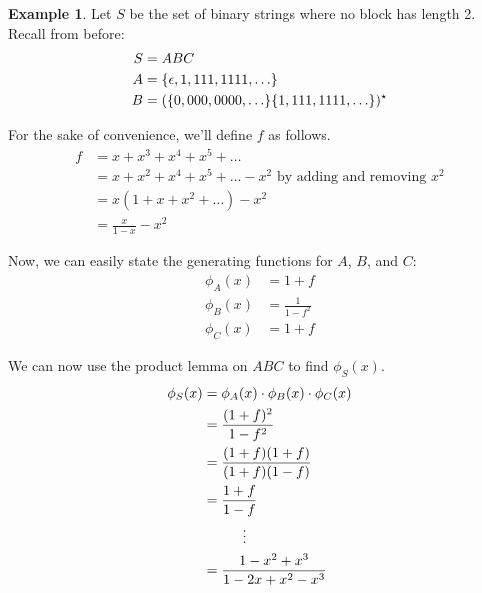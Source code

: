 \documentclass[]{article}
\theoremstyle{definition}
\newtheorem{ex}{Example}[section]
\DeclarePairedDelimiter{\set}{\lbrace}{\rbrace}
\begin{document}
			\begin{ex}
				Let $S$ be the set of binary strings where no block has length 2. Recall from before:
				\begin{align*}
					S &= ABC \\
					A &= \set{\epsilon, 1, 111, 1111, \ldots} \\
					B &= (\set{0, 000, 0000, \ldots}\set{1, 111, 1111, \ldots})^\star
				\end{align*}

				For the sake of convenience, we'll define $f$ as follows.
				\begin{align*}
					f &= x + x^3 + x^4 + x^5 + \ldots \\
					&= x + x^2 + x^4 + x^5 + \ldots - x^2 \text{ by adding and removing } x^2 \\
					&= x(1 + x + x^2 + \ldots) - x^2 \\
					&= \frac{x}{1 - x} - x^2
				\end{align*}

				Now, we can easily state the generating functions for $A$, $B$, and $C$:
				\begin{align*}
					\phi_A(x) &= 1 + f \\
					\phi_B(x) &= \frac{1}{1 - f^2} \\
					\phi_C(x) &= 1 + f
				\end{align*}

				We can now use the product lemma on $ABC$ to find $\phi_S(x)$.
				\begin{align*}
					\phi_S(x) &= \phi_A(x) \cdot \phi_B(x) \cdot \phi_C(x) \\
					&= \frac{(1 + f)^2}{1 - f^2} \\
					&= \frac{(1 + f)(1 + f)}{(1 + f)(1 - f)} \\
					&= \frac{1 + f}{1 - f} \\
					&\hspace{1cm} \text{\vdots} \\
					&= \frac{1 - x^2 + x^3}{1 - 2x + x^2 - x^3}
				\end{align*}
			\end{ex}
\end{document}
